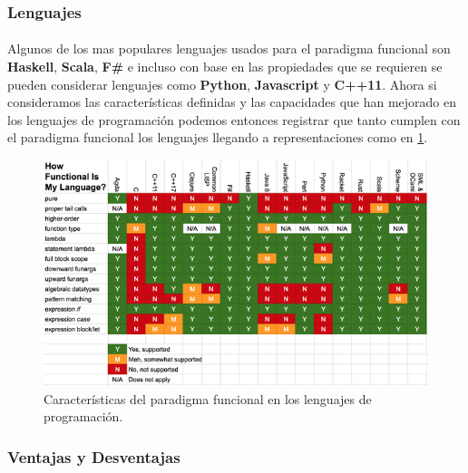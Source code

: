 \documentclass[12pt]{article}
\begin{document}
	\subsubsection{Lenguajes}
	\paragraph{}
	Algunos de los mas populares lenguajes usados para el paradigma funcional son \textbf{Haskell}, \textbf{Scala}, \textbf{F\#} e incluso con base en las propiedades que se requieren se pueden considerar lenguajes como \textbf{Python}, \textbf{Javascript} y \textbf{C++11}.
	Ahora si consideramos las características definidas y las capacidades que han mejorado en los lenguajes de programación podemos entonces registrar que tanto cumplen con el paradigma funcional los lenguajes llegando a representaciones como en \ref{fig:fp_language_table}.
		\begin{figure}[h]
			\centering
			\includegraphics[width=1\textwidth]{fp_language_table}
			\caption{Características del paradigma funcional en los lenguajes de programación.~\cite{quora_fp}}
			\label{fig:fp_language_table} 
		\end{figure}
	\pagebreak
	\subsubsection{Ventajas y Desventajas}
\end{document}
